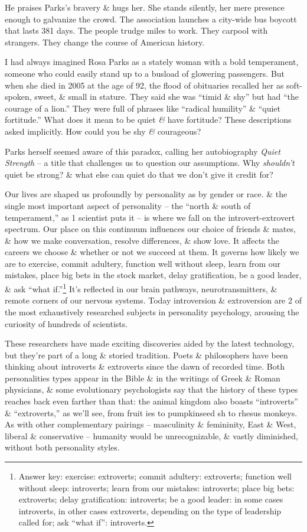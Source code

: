 \documentclass{article}
\numberwithin{equation}{section}
\begin{document}
He praises Parks's bravery \& hugs her. She stands silently, her mere presence enough to galvanize the crowd. The association launches a city-wide bus boycott that lasts 381 days. The people trudge miles to work. They carpool with strangers. They change the course of American history.

I had always imagined Rosa Parks as a stately woman with a bold temperament, someone who could easily stand up to a busload of glowering passengers. But when she died in 2005 at the age of 92, the flood of obituaries recalled her as soft-spoken, sweet, \& small in stature. They said she was ``timid \& shy'' but had ``the courage of a lion.'' They were full of phrases like ``radical humility'' \& ``quiet fortitude.'' What does it mean to be quiet \textit{\&} have fortitude? These descriptions asked implicitly. How could you be shy \textit{\&} courageous?

Parks herself seemed aware of this paradox, calling her autobiography \textit{Quiet Strength} -- a title that challenges us to question our assumptions. Why \textit{shouldn't} quiet be strong? \& what else can quiet do that we don't give it credit for?

Our lives are shaped us profoundly by personality as by gender or race. \& the single most important aspect of personality -- the ``north \& south of temperament,'' as 1 scientist puts it -- is where we fall on the introvert-extrovert spectrum. Our place on this continuum influences our choice of friends \& mates, \& how we make conversation, resolve differences, \& show love. It affects the careers we choose \& whether or not we succeed at them. It governs how likely we are to exercise, commit adultery, function well without sleep, learn from our mistakes, place big bets in the stock market, delay gratification, be a good leader, \& ask ``what if.''\footnote{Answer key: exercise: extroverts; commit adultery: extroverts; function well without sleep: introverts; learn from our mistakes: introverts; place big bets: extroverts; delay gratification: introverts; be a good leader: in some cases introverts, in other cases extroverts, depending on the type of leadership called for; ask ``what if'': introverts.} It's reflected in our brain pathways, neurotransmitters, \& remote corners of our nervous systems. Today introversion \& extroversion are 2 of the most exhaustively researched subjects in personality psychology, arousing the curiosity of hundreds of scientists.

These researchers have made exciting discoveries aided by the latest technology, but they're part of a long \& storied tradition. Poets \& philosophers have been thinking about introverts \& extroverts since the dawn of recorded time. Both personalities types appear in the Bible \& in the writings of Greek \& Roman physicians, \& some evolutionary psychologists say that the history of these types reaches back even farther than that: the animal kingdom also boasts ``introverts'' \& ``extroverts,'' as we'll see, from fruit ies to pumpkinseed sh to rhesus monkeys. As with other
complementary pairings -- masculinity \& femininity, East \& West, liberal \& conservative -- humanity would be unrecognizable, \& vastly diminished, without both personality styles.
\end{document}
